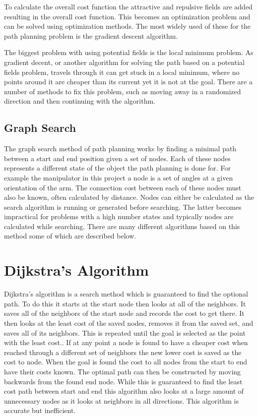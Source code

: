 To calculate the overall cost function the attractive and repulsive fields are added resulting in the overall cost function. This becomes an optimization problem and can be solved using optimization methods. The most widely used of these for the path planning problem is the gradient descent algorithm. 

The biggest problem with using potential fields is the local minimum problem. As gradient decent, or another algorithm for solving the path based on a potential fields problem, travels through it can get stuck in a local minimum, where no points around it are cheaper than its current yet it is not at the goal. There are a number of methods to fix this problem, such as moving away in a randomized direction and then continuing with the algorithm. 


\subsection{Graph Search}
The graph search method of path planning works by finding a minimal path between a start and end position given a set of nodes. Each of these nodes represents a different state of the object the path planning is done for. For example the manipulator in this project a node is a set of angles at a given orientation of the arm. The connection cost between each of these nodes must also be known, often calculated by distance. Nodes can either be calculated as the search algorithm is running or generated before searching. The latter becomes impractical for problems with a high number states and typically nodes are calculated while searching. There are many different algorithms based on this method some of which are described below.

\section{Dijkstra's Algorithm}
Dijkstra's algorithm is a search method which is guaranteed to find the optional path. To do this it starts at the start node then looks at all of the neighbors. It saves all of the neighbors of the start node and records the cost to get there. It then looks at the least cost of the saved nodes, removes it from the saved set, and saves all of its neighbors. This is repeated until the goal is selected as the point with the least cost.. If at any point a node is found to have a cheaper cost when reached through a different set of neighbors the new lower cost is saved as the cost to node. When the goal is found the cost to all nodes from the start to end have their costs known. The optimal path can then be constructed by moving backwards from the found end node. While this is guaranteed to find the least cost path between start and end this algorithm also looks at a large amount of unnecessary nodes as it looks at neighbors in all directions. This algorithm is accurate but inefficient. 

